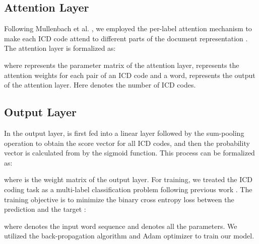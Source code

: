 \documentclass[letterpaper]{article} \usepackage{aaai20}  \usepackage{times}  \usepackage{helvet} \usepackage{courier}  \usepackage[hyphens]{url}  \usepackage{graphicx} \urlstyle{rm} \def\UrlFont{\rm}  \usepackage{graphicx}  \frenchspacing  \setlength{\pdfpagewidth}{8.5in}  \setlength{\pdfpageheight}{11in}
\begin{document}
\subsection{Attention Layer}

Following Mullenbach et al. , we employed the per-label attention mechanism to make each ICD code attend to different parts of the document representation . The attention layer is formalized as:


where  represents the parameter matrix of the attention layer,  represents the attention weights for each pair of an ICD code and a word,  represents the output of the attention layer. Here  denotes the number of ICD codes.


\subsection{Output Layer}
In the output layer,  is first fed into a linear layer followed by the sum-pooling operation to obtain the score vector  for all ICD codes, and then the probability vector  is calculated from  by the sigmoid function. This process can be formalized as:


where  is the weight matrix of the output layer. For training, we treated the ICD coding task as a multi-label classification problem following previous work \cite{mccallum1999multi,mullenbach2018explainable}. The training objective is to minimize the binary cross entropy loss between the prediction  and the target :


where  denotes the input word sequence and  denotes all the parameters. We utilized the back-propagation algorithm and Adam optimizer \cite{kingma2014adam} to train our model.
\end{document}
